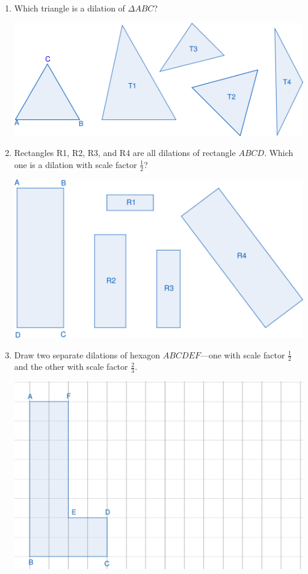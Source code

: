 \begin{enumerate}
    \item Which triangle is a dilation of $\Delta ABC$?
    \begin{center}\includegraphics[width=5in]{images/dilation01}\end{center}
    \item Rectangles R1, R2, R3, and R4 are all dilations of rectangle $ABCD$. Which one is a dilation with scale factor $\displaystyle\frac12$?\par
    \begin{center}\includegraphics[width=5in]{images/dilation02}\end{center}
    \wbnewpage
    \item Draw two separate dilations of hexagon $ABCDEF$---one with scale factor $\displaystyle \frac12$ and the other with scale factor $\displaystyle\frac23$.\par
    \begin{center}\includegraphics[width=5in]{images/dilation03}\end{center}

\end{enumerate}
